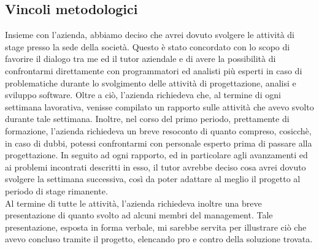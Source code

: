 \subsection{Vincoli metodologici}
Insieme con l'azienda, abbiamo deciso che avrei dovuto svolgere le attività di stage presso la sede della società. Questo è stato concordato con lo scopo di favorire il dialogo tra me ed il tutor aziendale e di avere la possibilità di confrontarmi direttamente con programmatori ed analisti più esperti in caso di problematiche durante lo svolgimento delle attività di progettazione, analisi e sviluppo software.
Oltre a ciò, l’azienda richiedeva che, al termine di ogni settimana lavorativa, venisse compilato un rapporto sulle attività che avevo svolto durante tale settimana. Inoltre, nel corso del primo periodo, prettamente di formazione, l'azienda richiedeva un breve resoconto di quanto compreso, cosicchè, in caso di dubbi, potessi confrontarmi con personale esperto prima di passare alla progettazione.
In seguito ad ogni rapporto, ed in particolare agli avanzamenti ed ai problemi incontrati descritti in esso, il tutor avrebbe deciso cosa avrei dovuto svolgere la settimana successiva, così da poter adattare al meglio il progetto al periodo di stage rimanente.\\
Al termine di tutte le attività, l'azienda richiedeva inoltre una breve presentazione di quanto svolto ad alcuni membri del management. Tale presentazione, esposta in forma verbale, mi sarebbe servita per illustrare ciò che avevo concluso tramite il progetto, elencando pro e contro della soluzione trovata.
